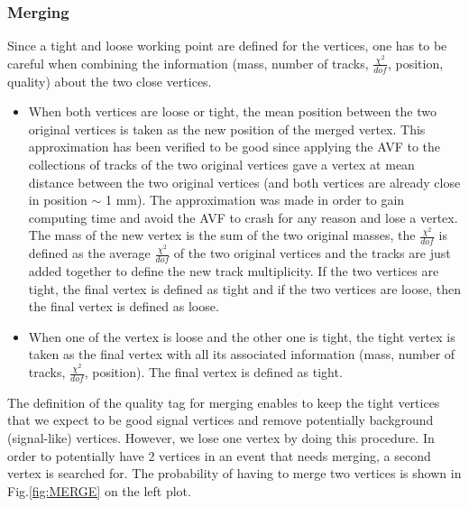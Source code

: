 \documentclass{cernatlasnote}
\begin{document}
        \subsubsection{Merging}
            Since a tight and loose working point are defined for the vertices, one has to be careful when combining the information (mass, number of tracks, $\frac{\chi^2}{dof}$, position, quality) about the two close vertices.
            \begin{itemize}
                \item When both vertices are loose or tight, the mean position between the two original vertices is taken as the new position of the merged vertex. This approximation has been verified to be good since applying the AVF to the collections of tracks of the two original vertices gave a vertex at mean distance between the two original vertices (and both vertices are already close in position $\sim$ 1 mm). The approximation was made in order to gain computing time and avoid the AVF to crash for any reason and lose a vertex. The mass of the new vertex is the sum of the two original masses, the $\frac{\chi^2}{dof}$ is defined as the average $\frac{\chi^2}{dof}$ of the two original vertices and the tracks are just added together to define the new track multiplicity. If the two vertices are tight, the final vertex is defined as tight and if the two vertices are loose, then the final vertex is defined as loose.               
                \item When one of the vertex is loose and the other one is tight, the tight vertex is taken as the final vertex with all its associated information  (mass, number of tracks, $\frac{\chi^2}{dof}$, position). The final vertex is defined as tight.
            \end{itemize}
        The definition of the quality tag for merging enables to keep the tight vertices that we expect to be good signal vertices and remove potentially background (signal-like) vertices. However, we lose one vertex by doing this procedure. In order to potentially have 2 vertices in an event that needs merging, a second vertex is searched for. The probability of having to merge two vertices is shown in Fig.\ref{fig:MERGE} on the left plot.
\end{document}
